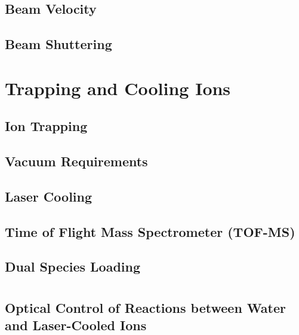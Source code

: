 \documentclass [PhD,nolistoftables,scheader] {uclathes}
\begin{document}
	\section{Beam Velocity}
	
	
	\section{Beam Shuttering}
	

\chapter{Trapping and Cooling Ions}


	\section{Ion Trapping}
	
	
	\section{Vacuum Requirements}
	
	
	\section{ Laser Cooling}
	

	\section{Time of Flight Mass Spectrometer (TOF-MS)}
	
	
	\section{Dual Species Loading}
	

\chapter{}
	\section{Optical Control of Reactions between Water and Laser-Cooled  Ions}
	
\end{document}

